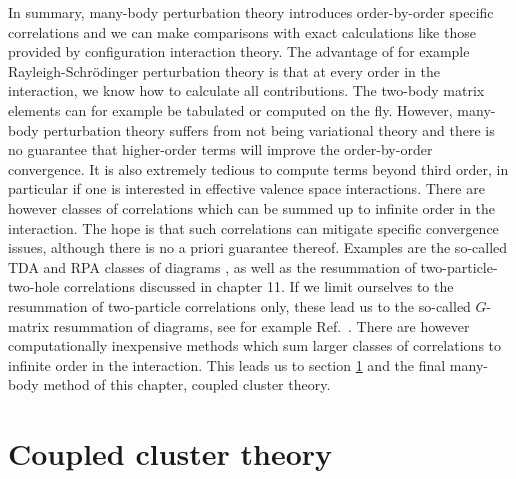 In summary, many-body perturbation theory introduces order-by-order
specific correlations and we can make comparisons with exact
calculations like those provided by configuration interaction theory.
The advantage of for example Rayleigh-Schr\"odinger perturbation
theory is that at every order in the interaction, we know how to
calculate all contributions. The two-body matrix elements can for example  be tabulated or
computed on the fly.  However, many-body perturbation theory suffers
from not being variational theory and there is no guarantee that
higher-order terms will improve the order-by-order convergence.  It is
also extremely tedious to compute terms beyond third order, in
particular if one is interested in effective valence space
interactions.  There are however classes of correlations which can be
summed up to infinite order in the interaction.  The hope is that such
correlations can mitigate specific convergence issues, although there
is no a priori guarantee thereof.  Examples are the so-called TDA and
RPA classes of diagrams \cite{blaizot,Dickhoff2008,Mattuck1992}, as well as the resummation
of two-particle-two-hole correlations discussed in chapter 11. If we limit ourselves to the
resummation of two-particle correlations only, these lead us to the
so-called $G$-matrix resummation of diagrams, see for example Ref.~\cite{day1967}.
There are however computationally inexpensive methods which
sum larger classes of correlations to infinite order in the
interaction. This leads us to section \ref{sec:chap8cctheory} and the final
many-body method of this chapter, coupled cluster theory. 


\section{Coupled cluster theory}\label{sec:chap8cctheory}
  
